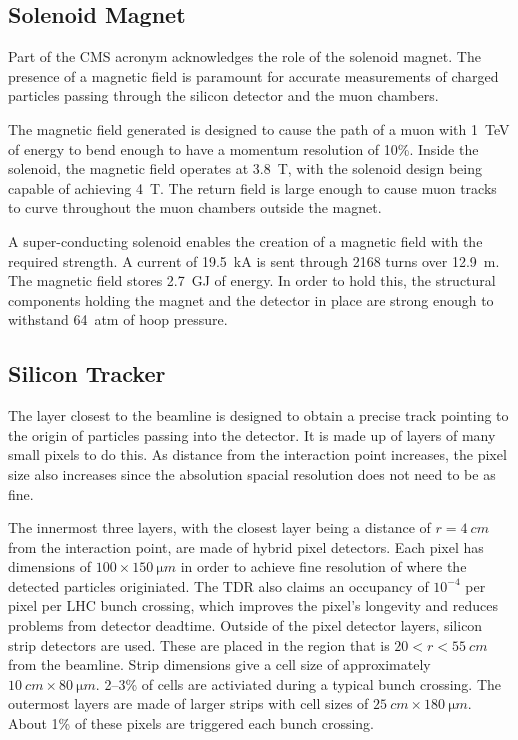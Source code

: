 \subsection{Solenoid Magnet}

Part of the CMS acronym acknowledges the role of the solenoid magnet.
The presence of a magnetic field is paramount for accurate measurements
of charged particles passing through the silicon detector and the muon chambers.

The magnetic field generated is designed to cause the path of
a muon with \SI{1}{TeV} of energy to bend enough to have a momentum resolution of 10\%.
Inside the solenoid, the magnetic field operates at \SI{3.8}{T},
with the solenoid design being capable of achieving \SI{4}{T}.
The return field is large enough to cause muon tracks to curve throughout
the muon chambers outside the magnet.

A super-conducting solenoid enables the creation of a magnetic field
with the required strength.
A current of \SI{19.5}{kA} is sent through 2168 turns over \SI{12.9}{m}.
The magnetic field stores \SI{2.7}{GJ} of energy.
In order to hold this, the structural components holding the magnet and
the detector in place are strong enough to withstand \SI{64}{atm} of hoop pressure.

\subsection{Silicon Tracker}

The layer closest to the beamline is designed to obtain a precise track pointing
to the origin of particles passing into the detector.
It is made up of layers of many small pixels to do this.
As distance from the interaction point increases, the pixel size also increases
since the absolution spacial resolution does not need to be as fine.

The innermost three layers, with the closest layer being a distance of
$r=\SI{4}{cm}$ from the interaction point,
are made of hybrid pixel detectors.
Each pixel has dimensions of $100 \times \SI{150}{\micro m}$
in order to achieve fine resolution of where the detected particles originiated.
The TDR also claims an occupancy of $10^{-4}$ per pixel per LHC bunch crossing,
which improves the pixel's longevity and reduces problems from detector deadtime.
Outside of the pixel detector layers,
silicon strip detectors are used.
These are placed in the region that is $20 < r < \SI{55}{cm}$ from the beamline.
Strip dimensions give a cell size of approximately $\SI{10}{cm} \times \SI{80}{\micro m}$.
2--3\% of cells are activiated during a typical bunch crossing.
The outermost layers are made of larger strips with cell sizes of
$\SI{25}{cm} \times \SI{180}{\micro m}$.
About 1\% of these pixels are triggered each bunch crossing.

